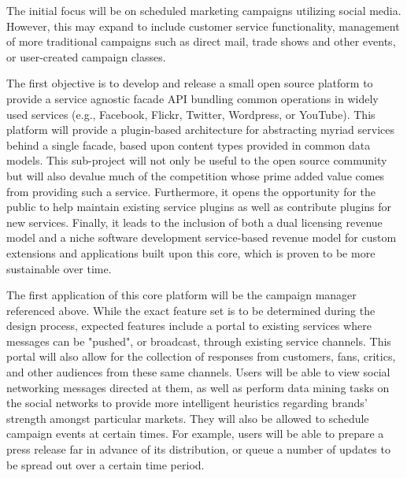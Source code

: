 \documentclass{report}
\begin{document}
The initial focus will be on scheduled marketing campaigns utilizing
social media. However, this may expand to include customer service
functionality, management of more traditional campaigns such as
direct mail, trade shows and other events, or user-created campaign
classes.
 
The first objective is to develop and release a small open source
platform to provide a service agnostic facade API bundling common
operations in widely used services (e.g., Facebook, Flickr, Twitter,
Wordpress, or YouTube). This platform will provide a plugin-based
architecture for abstracting myriad services behind a single facade,
based upon content types provided in common data models. This
sub-project will not only be useful to the open source community but
will also devalue much of the competition whose prime added value
comes from providing such a service. Furthermore, it opens the
opportunity for the public to help maintain existing service plugins
as well as contribute plugins for new services. Finally, it leads to
the inclusion of both a dual licensing revenue model and a niche
software development service-based revenue model for custom extensions
and applications built upon this core, which is proven to be more
sustainable over time.
 
The first application of this core platform will be the campaign
manager referenced above.  While the exact feature set is to be
determined during the design process, expected features include a
portal to existing services where messages can be "pushed", or
broadcast, through existing service channels. This portal will also
allow for the collection of responses from customers, fans, critics,
and other audiences from these same channels. Users will be able to
view social networking messages directed at them, as well as perform
data mining tasks on the social networks to provide more intelligent
heuristics regarding brands' strength amongst particular markets. They
will also be allowed to schedule campaign events at certain times. For
example, users will be able to prepare a press release far in advance
of its distribution, or queue a number of updates to be spread out
over a certain time period.
\end{document}
